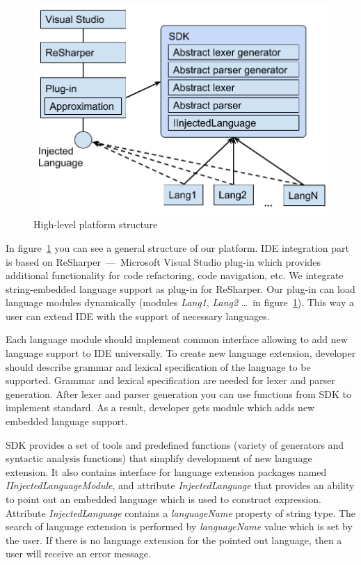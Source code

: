 \documentclass{acm_proc_article-sp}
\begin{document}
\begin{figure}[h!]
    \begin{center}
        \includegraphics[scale=0.5]{graphics/Structure_of_platform.pdf}
    \end{center}
    \caption{High-level platform structure}
    \label{platform_structure}
\end{figure}

In figure~\ref{platform_structure} you can see a general structure of our platform. IDE integration part is based on ReSharper~---~Microsoft Visual Studio plug-in which provides additional functionality for code refactoring, code navigation, etc. We integrate string-embedded language support as plug-in for ReSharper. Our plug-in can load language modules dynamically  (modules {\it Lang1}, {\it Lang2} \ldots \ in figure~\ref{platform_structure}). This way a user can extend IDE with the support of necessary languages. 

Each language module should implement common interface allowing to add new language support to IDE universally. To create new language extension, developer should describe grammar and lexical specification of the language to be supported. Grammar and lexical specification are needed for lexer and parser generation. After lexer and parser generation you can use functions from SDK to implement standard. As a result, developer gets module which adds new embedded language support.

SDK provides a set of tools and predefined functions (variety of generators and syntactic analysis functions) that simplify development of new language extension. It also contains interface for language extension packages named {\it IInjectedLanguageModule}, and attribute {\it InjectedLanguage} that provides an ability to point out an embedded language which is used to construct expression. Attribute {\it InjectedLanguage} contains a {\it languageName} property of string type. The search of language extension is performed by {\it languageName} value which is set by the user. If there is no language extension for the pointed out language, then a user will receive an error message.
\end{document}
